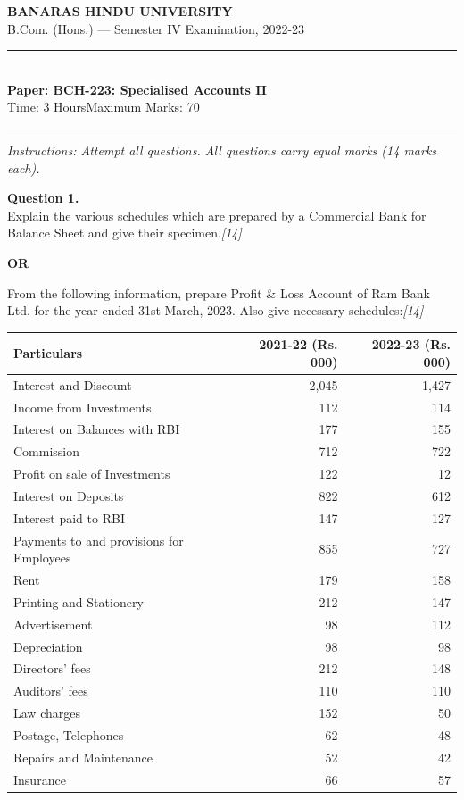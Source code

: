 \documentclass[11pt,a4paper]{article}
\newcommand{\pts}[1]{\hfill   \textit{[#1]}}
\begin{document}
\begin{center}
  {\large\bfseries BANARAS HINDU UNIVERSITY}\\[2pt]
  {\normalsize B.Com. (Hons.) --- Semester IV Examination, 2022-23}\\[6pt]
  \rule{0.8\linewidth}{0.5pt}\\[6pt]
  {\large\bfseries Paper: BCH-223: Specialised Accounts II}\\[4pt]
  {\normalsize Time: 3 Hours\hfill Maximum Marks: 70}
\end{center}

\rule{\linewidth}{0.4pt}

\smallskip



\noindent   \textit{Instructions: Attempt all questions. All questions carry equal marks (14 marks each).}

\bigskip




\noindent   \textbf{Question 1.} \\
Explain the various schedules which are prepared by a Commercial Bank for Balance Sheet and give their specimen.\pts{14}

\centerline{   \textbf{OR}}

From the following information, prepare Profit \& Loss Account of Ram Bank Ltd. for the year ended 31st March, 2023. Also give necessary schedules:\pts{14}


\begin{center}
\renewcommand{\arraystretch}{1.2}
\small

\begin{tabular}{|l|r|r|}
\hline
   \textbf{Particulars} &   \textbf{2021-22 (Rs. 000)} &   \textbf{2022-23 (Rs. 000)} \\
\hline
Interest and Discount & 2,045 & 1,427 \\
Income from Investments & 112 & 114 \\
Interest on Balances with RBI & 177 & 155 \\
Commission & 712 & 722 \\
Profit on sale of Investments & 122 & 12 \\
Interest on Deposits & 822 & 612 \\
Interest paid to RBI & 147 & 127 \\
Payments to and provisions for Employees & 855 & 727 \\
Rent & 179 & 158 \\
Printing and Stationery & 212 & 147 \\
Advertisement & 98 & 112 \\
Depreciation & 98 & 98 \\
Directors' fees & 212 & 148 \\
Auditors' fees & 110 & 110 \\
Law charges & 152 & 50 \\
Postage, Telephones & 62 & 48 \\
Repairs and Maintenance & 52 & 42 \\
Insurance & 66 & 57 \\
\hline
\end{tabular}
\end{center}
\end{document}

